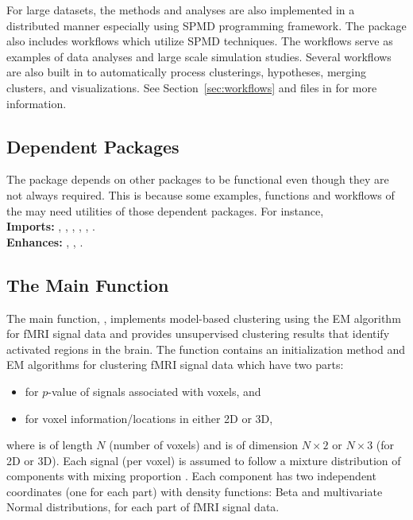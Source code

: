 For large datasets, the methods and analyses are also implemented in a
distributed manner 
especially using SPMD programming framework.
The package also includes workflows which utilize SPMD techniques.
The workflows serve as examples of data analyses and
large scale simulation studies. Several workflows are also built in to
automatically process clusterings, hypotheses, merging clusters, and
visualizations. See Section~\ref{sec:workflows} and files in
 for more information.


\subsection[Dependent Packages]{Dependent Packages}

The  package depends on other  packages to be
functional even though they are not always required. This is because
some examples, functions and workflows of the 
 may need utilities of those dependent packages.
For instance,
\\
\hspace*{0.5cm}
{\bf Imports:} , , ,
, , .
\\
\hspace*{0.5cm}
{\bf Enhances:} , , .


\subsection[The Main Function]{The Main Function}

The main function, , implements model-based clustering
using the EM algorithm~\citep{McLachlan1996} for fMRI signal data and
provides unsupervised clustering results that identify activated regions
in the brain. The  function contains an initialization method and
EM algorithms for clustering fMRI signal data which have two parts:
\begin{itemize}
\item
{} for $p$-value of signals associated with voxels, and
\item
{} for voxel information/locations in either 2D or 3D,
\end{itemize}
where  is of length $N$ (number of voxels) and
 is of dimension $N \times 2$ or $N \times 3$ (for 2D or 3D).
Each signal (per voxel) is assumed to follow a mixture distribution
of  components with mixing proportion .
Each component has
two independent coordinates (one for each part)
with density functions: Beta and multivariate
Normal distributions, for each part of fMRI signal data.
\\

